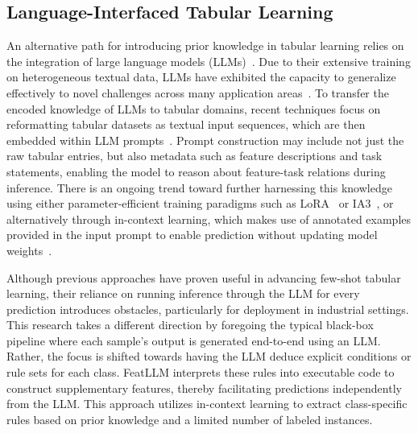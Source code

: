 \subsection{Language-Interfaced Tabular Learning}
An alternative path for introducing prior knowledge in tabular learning relies on the integration of large language models (LLMs)~\cite{anil2023palm,openai2023gpt4}. Due to their extensive training on heterogeneous textual data, LLMs have exhibited the capacity to generalize effectively to novel challenges across many application areas~\cite{brown2020language}. To transfer the encoded knowledge of LLMs to tabular domains, recent techniques focus on reformatting tabular datasets as textual input sequences, which are then embedded within LLM prompts~\cite{dinh2022lift,hegselmann2023tabllm,wang2023anypredict}. Prompt construction may include not just the raw tabular entries, but also metadata such as feature descriptions and task statements, enabling the model to reason about feature-task relations during inference. There is an ongoing trend toward further harnessing this knowledge using either parameter-efficient training paradigms such as LoRA~\cite{hu2021lora} or IA3~\cite{liu2022few}, or alternatively through in-context learning, which makes use of annotated examples provided in the input prompt to enable prediction without updating model weights~\cite{dinh2022lift,hegselmann2023tabllm,nam2023semi,slack2023tablet}.

Although previous approaches have proven useful in advancing few-shot tabular learning, their reliance on running inference through the LLM for every prediction introduces obstacles, particularly for deployment in industrial settings. This research takes a different direction by foregoing the typical black-box pipeline where each sample's output is generated end-to-end using an LLM. Rather, the focus is shifted towards having the LLM deduce explicit conditions or rule sets for each class. \textsf{FeatLLM} interprets these rules into executable code to construct supplementary features, thereby facilitating predictions independently from the LLM. This approach utilizes in-context learning to extract class-specific rules based on prior knowledge and a limited number of labeled instances.

